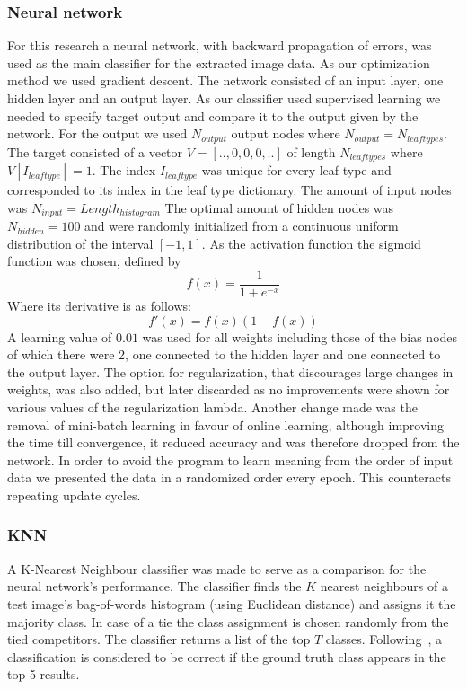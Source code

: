 \subsubsection{Neural network}
For this research a neural network, with backward propagation of errors, was used as the main classifier for the extracted image data. As our optimization method we used gradient descent. The network consisted of an input layer, one hidden layer and an output layer.
As our classifier used supervised learning we needed to specify target output and compare it to the output given by the network. For the output we used $N_{output}$ output nodes where $N_{output}=N_{leaftypes}$. The target consisted of a vector $V=[..,0,0,0,..]$ of length $N_{leaftypes}$ where $V[I_{leaftype}]=1$. The index $I_{leaftype}$ was unique for every leaf type and corresponded to its index in the leaf type dictionary. The amount of input nodes was $N_{input}=Length_{histogram}$ The optimal amount of hidden nodes was $N_{hidden}=100$ and were randomly initialized from a continuous uniform distribution of the interval $[-1, 1]$.
As the activation function the sigmoid function was chosen, defined by $$f(x)=\frac{1}{1+e^{-x}}$$
Where its derivative is as follows:
$$f'(x)=f(x)(1-f(x))$$
A learning value of $0.01$ was used for all weights including those of the bias nodes of which there were 2, one connected to the hidden layer and one connected to the output layer. The option for regularization, that discourages large changes in weights, was also added, but later discarded as no improvements were shown for various values of the regularization lambda. Another change made was the removal of mini-batch learning in favour of online learning, although improving the time till convergence, it reduced accuracy and was therefore dropped from the network.
In order to avoid the program to learn meaning from the order of input data we presented the data in a randomized order every epoch. This counteracts repeating update cycles.

\subsubsection{KNN}
A K-Nearest Neighbour classifier was made to serve as a comparison for the neural network's performance.
The classifier finds the $K$ nearest neighbours of a test image's bag-of-words histogram (using Euclidean distance) and assigns it the majority class.
In case of a tie the class assignment is chosen randomly from the tied competitors.
The classifier returns a list of the top $T$ classes.
Following~\cite{Wang2011, Belh2008}, a classification is considered to be correct if the ground truth class appears in the top 5 results. 
